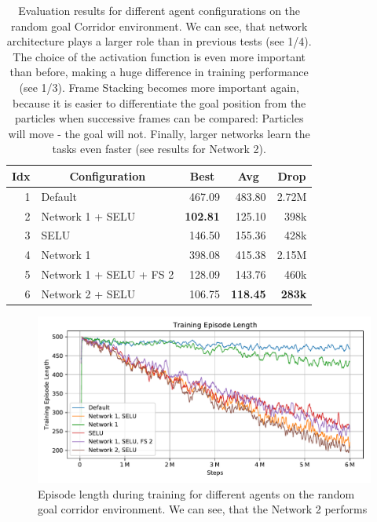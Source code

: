 \begin{table}[htp]
    \begin{center}
        \begin{tabular}{rlrrr}
            \toprule
            \multicolumn{1}{c}{Idx} & \multicolumn{1}{c}{Configuration} & \multicolumn{1}{c}{Best} & \multicolumn{1}{c}{Avg} & \multicolumn{1}{c}{Drop}\\
            \midrule
            1 & Default & 467.09 & 483.80 & 2.72M \\
            2 & Network 1 + SELU & \textbf{102.81} & 125.10 & 398k \\
            3 & SELU & 146.50 & 155.36 & 428k \\
            4 & Network 1 & 398.08 & 415.38 & 2.15M \\ 
            5 & Network 1 + SELU + FS 2 & 128.09 & 143.76 & 460k \\
            6 & Network 2 + SELU & 106.75 & \textbf{118.45} & \textbf{283k} \\
            \bottomrule
        \end{tabular}
    \end{center}
    \caption[Evaluation Results for Different Agents on the Random Goal Corridor Environment]{Evaluation results for different agent configurations on the random goal Corridor environment. We can see, that network architecture plays a larger role than in previous tests (see 1/4). The choice of the activation function is even more important than before, making a huge difference in training performance (see 1/3). Frame Stacking becomes more important again, because it is easier to differentiate the goal position from the particles when successive frames can be compared: Particles will move - the goal will not. Finally, larger networks learn the tasks even faster (see results for Network 2).} \label{tab:Eval/RandomGoal/Maze0318}
\end{table}

\begin{figure}[htp]
    \begin{center}
        \includegraphics[clip, width=0.95\columnwidth]{figures/evaluation/randomness/goals/maze0318_episode_length.pdf}
    \end{center}
    \caption[Episode Length for Different Agents on the Random Goal Corridor Environment]{Episode length during training for different agents on the random goal corridor environment. We can see, that the Network 2 performs } \label{fig:Eval/RandomGoal/Maze0318}
\end{figure}

